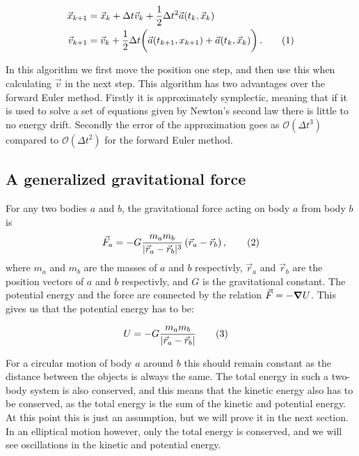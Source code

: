 \documentclass[reprint,english,notitlepage]{revtex4-1}  %
\newcommand\numberthis{\addtocounter{equation}{1}\tag{\theequation}}
\begin{document}
\begin{align*}
\vec{x}_{k+1} &= \vec{x}_k + \Delta t \vec{v}_k + \frac{1}{2} \Delta t^2 \vec{a}(t_k,\vec{x}_k) \\
\vec{v}_{k+1} &= \vec{v}_k + \frac{1}{2}\Delta t \bigg( \vec{a}(t_{k+1},x_{k+1}) + \vec{a}(t_k, \vec{x}_k) \bigg) \, . \numberthis \label{eq:VelocityVerlet}
\end{align*}

In this algorithm we first move the position one step, and then use this when calculating $\vec{v}$ in the next step. This algorithm has two advantages over the forward Euler method. Firstly it is approximately symplectic, meaning that if it is used to solve a set of equations given by Newton's second law there is little to no energy drift. Secondly the error of the approximation goes as $\mathcal{O}(\Delta t^3)$ compared to $\mathcal{O}(\Delta t^2)$ for the forward Euler method.

\subsection{A generalized gravitational force} \label{sec:II:b}
For any two bodies \(a\) and \(b\), the gravitational force acting on body \(a\) from body \(b\) is
\begin{align*}
	\vec{F}_{a} = -G\frac{m_{a}m_{b}}{|\vec{r}_{a}-\vec{r}_{b}|^{3}}\left(\vec{r}_{a}-\vec{r}_{b}\right), \numberthis \label{eq:grav} \\
\end{align*}
where \(m_{a}\) and \(m_{b}\) are the masses of \(a\) and \(b\) respectivly, \(\vec{r}_{a}\) and \(\vec{r}_{b}\) are the position vectors of \(a\) and \(b\) respectivly, and \(G\) is the gravitational constant. The potential energy and the force are connected by the relation $\vec{F} = - \gradient U$. This gives us that the potential energy has to be:

\begin{align*}
U &= - G \frac{m_a m_b}{|\vec{r}_a - \vec{r}_b|} \numberthis \label{eq:pot_en}
\end{align*}

For a circular motion of body $a$ around $b$ this should remain constant as the distance between the objects is always the same. The total energy in such a two-body system is also conserved, and this means that the kinetic energy also has to be conserved, as the total energy is the sum of the kinetic and potential energy. At this point this is just an assumption, but we will prove it in the next section. In an elliptical motion however, only the total energy is conserved, and we will see oscillations in the kinetic and potential energy.
\end{document}
